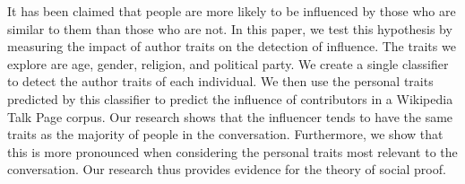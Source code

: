 It has been claimed that people are more likely to be influenced by those who are similar to them than those who are not. In this paper, we test this hypothesis by measuring the impact of author traits on the detection of influence. The traits we explore are age, gender, religion, and political party. We create a single classifier to detect the author traits of each individual. We then use the personal traits predicted by this classifier to predict the influence of contributors in a Wikipedia Talk Page corpus. Our research shows that the influencer tends to have the same traits as the majority of people in the conversation. Furthermore, we show that this is more pronounced when considering the personal traits most relevant to the conversation. Our research thus provides evidence for the theory of social proof.

